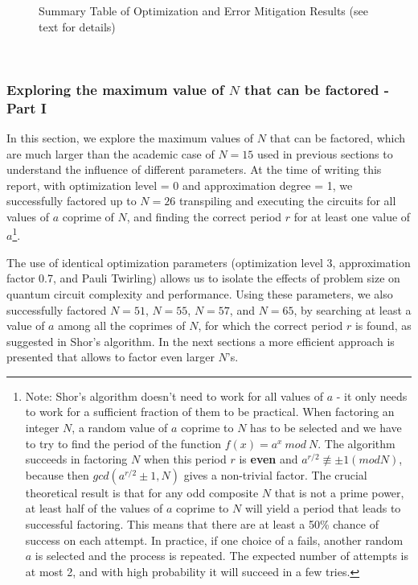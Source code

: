 \documentclass[conference,twoside]{IEEEtran}
\begin{document}
\begin{figure}[!htbp]
\begin{tabular*}{\textwidth}{@{} l l l l @{}}
\bottomrule
\end{tabular*}
\caption{Summary Table of Optimization and Error Mitigation Results (see text for details)}
\label{tab:wide_table}
\end{figure}

\\


\subsubsection{Exploring the maximum value of $N$ that can be factored - Part I }

In this section, we explore the maximum values of $N$ that can be factored, which are much larger than the academic case of $N=15$ used in previous sections to understand the influence of different parameters. At the time of writing this report, with optimization level = 0 and approximation degree = 1, we successfully factored up to $N=26$ transpiling and executing the circuits for all values of $a$ coprime of $N$, and finding the correct period $r$ for at least one value of $a$\footnote{Note: Shor's algorithm doesn't need to work for all values of $a$ - it only needs to work for a sufficient fraction of them to be practical. When factoring an integer $N$, a random value of $a$ coprime to $N$ has to be selected and we have to try to find the period of the function \(f(x) = a^x \ mod \ N\). The algorithm succeeds in factoring $N$ when this period $r$ is \textbf{even} and \(a^{r/2} ≢ ±1 (mod N) \), because then \(gcd(a^{r/2} ± 1, N) \) gives a non-trivial factor. The crucial theoretical result is that for any odd composite $N$ that is not a prime power, at least half of the values of $a$ coprime to $N$ will yield a period that leads to successful factoring. This means that there are at least a 50\% chance of success on each attempt. In practice, if one choice of a fails, another random $a$ is selected and the process is repeated. The expected number of attempts is at most 2, and with high probability it will succeed in a few tries.}.

The use of identical optimization parameters (optimization level 3, approximation factor 0.7, and Pauli Twirling) allows us to isolate the effects of problem size on quantum circuit complexity and performance. Using these parameters, we also successfully factored $N=51$, $N=55$, $N=57$, and $N=65$, by searching at least a value of $a$ among all the coprimes of $N$, for which the correct period $r$ is found, as suggested in Shor's algorithm. In the next sections a more efficient approach is presented that allows to factor even larger $N$'s.
\end{document}
